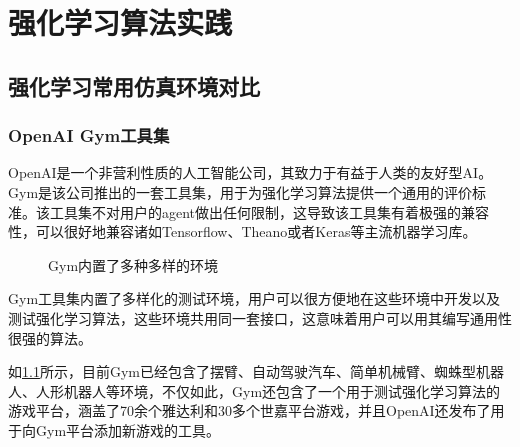 \documentclass[bachelor]{thesis-uestc}
\begin{document}
	\chapter{强化学习算法实践}
	\section{强化学习常用仿真环境对比}
	\subsection{OpenAI Gym工具集}
	OpenAI是一个非营利性质的人工智能公司，其致力于有益于人类的友好型AI。Gym是该公司推出的一套工具集，用于为强化学习算法提供一个通用的评价标准。该工具集不对用户的agent做出任何限制，这导致该工具集有着极强的兼容性，可以很好地兼容诸如Tensorflow、Theano或者Keras等主流机器学习库。
	
	\begin{figure}[h]
		\centering
		\caption{Gym内置了多种多样的环境}
		\label{openai}
	\end{figure}
	
	Gym工具集内置了多样化的测试环境，用户可以很方便地在这些环境中开发以及测试强化学习算法，这些环境共用同一套接口，这意味着用户可以用其编写通用性很强的算法。
	
	如\ref{openai}所示，目前Gym已经包含了摆臂、自动驾驶汽车、简单机械臂、蜘蛛型机器人、人形机器人等环境，不仅如此，Gym还包含了一个用于测试强化学习算法的游戏平台，涵盖了70余个雅达利和30多个世嘉平台游戏，并且OpenAI还发布了用于向Gym平台添加新游戏的工具。
	
\end{document}

